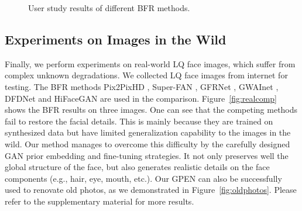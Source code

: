 \documentclass[final]{cvpr}
\begin{document}
\begin{figure}
\centering
\vspace*{0mm}
\caption{User study results of different BFR methods.}
\label{fig:ustudy}
\vspace*{-5mm}
\end{figure}

\subsection{Experiments on Images in the Wild}
Finally, we perform experiments on real-world LQ face images, which suffer from complex unknown degradations. We collected  LQ face images from internet for testing. The BFR methods Pix2PixHD \cite{Wang2018Pix2PixHD}, Super-FAN \cite{Bulat2018SuperFAN}, GFRNet \cite{Li2018GFRNet}, GWAInet \cite{Dogan2019Exemplar}, DFDNet \cite{Li2020Restore} and HiFaceGAN \cite{Yang2020HiFaceGANFR} are used in the comparison. Figure~\ref{fig:realcomp} shows the BFR results on three images. One can see that the competing methods fail to restore the facial details. This is mainly because they are trained on synthesized data but have limited generalization capability to the images in the wild. Our method manages to overcome this difficulty by the carefully designed GAN prior embedding and fine-tuning strategies. It not only preserves well the global structure of the face, but also generates realistic details on the face components (e.g., hair, eye, mouth, etc.). Our GPEN can also be successfully used to renovate old photos, as we demonstrated in Figure~\ref{fig:oldphotos}. Please refer to the supplementary material for more results.
\end{document}
